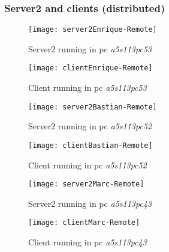 \clearpage
\subsubsection{Server2 and clients (distributed)}
\begin{figure}[ht]
\texttt{[image: server2Enrique-Remote]}
\caption{Server2 running in pc \textit{a5s113pc53}}
\end{figure}

\begin{figure}[ht]
\texttt{[image: clientEnrique-Remote]}
\caption{Client running in pc \textit{a5s113pc53}}
\end{figure}

\begin{figure}[ht]
\texttt{[image: server2Bastian-Remote]}
\caption{Server2 running in pc \textit{a5s113pc52}}
\end{figure}

\begin{figure}[ht]
\texttt{[image: clientBastian-Remote]}
\caption{Client running in pc \textit{a5s113pc52}}
\end{figure}

\begin{figure}[ht]
\texttt{[image: server2Marc-Remote]}
\caption{Server2 running in pc \textit{a5s113pc43}}
\end{figure}

\begin{figure}[ht]
\texttt{[image: clientMarc-Remote]}
\caption{Client running in pc \textit{a5s113pc43}}
\end{figure}